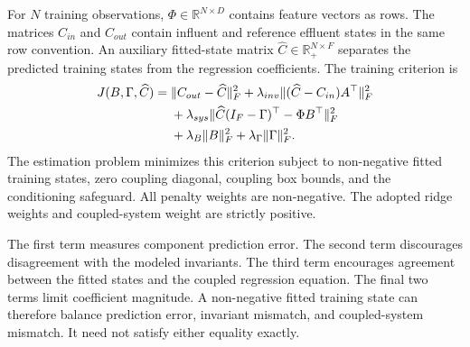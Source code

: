 For \(N\) training observations, \(\Phi\in\mathbb{R}^{N\times D}\) contains feature vectors as rows. The matrices \(C_{in}\) and \(C_{out}\) contain influent and reference effluent states in the same row convention. An auxiliary fitted-state matrix \(\widehat C\in\mathbb{R}_{+}^{N\times F}\) separates the predicted training states from the regression coefficients. The training criterion is
\begin{equation}
\equationname{Matrix form of the structured-regression training objective}
\label{eq:icsor_training_objective}
\begin{aligned}
J(B,\Gamma,\widehat C)={}&
\|C_{out}-\widehat C\|_F^2
+\lambda_{inv}\| (\widehat C-C_{in})A^\top\|_F^2\\
&+\lambda_{sys}\|\widehat C(I_F-\Gamma)^\top-\Phi B^\top\|_F^2\\
&+\lambda_B\|B\|_F^2+\lambda_{\Gamma}\|\Gamma\|_F^2.
\end{aligned}
\end{equation}
The estimation problem minimizes this criterion subject to non-negative fitted training states, zero coupling diagonal, coupling box bounds, and the conditioning safeguard. All penalty weights are non-negative. The adopted ridge weights and coupled-system weight are strictly positive.

The first term measures component prediction error. The second term discourages disagreement with the modeled invariants. The third term encourages agreement between the fitted states and the coupled regression equation. The final two terms limit coefficient magnitude. A non-negative fitted training state can therefore balance prediction error, invariant mismatch, and coupled-system mismatch. It need not satisfy either equality exactly.

